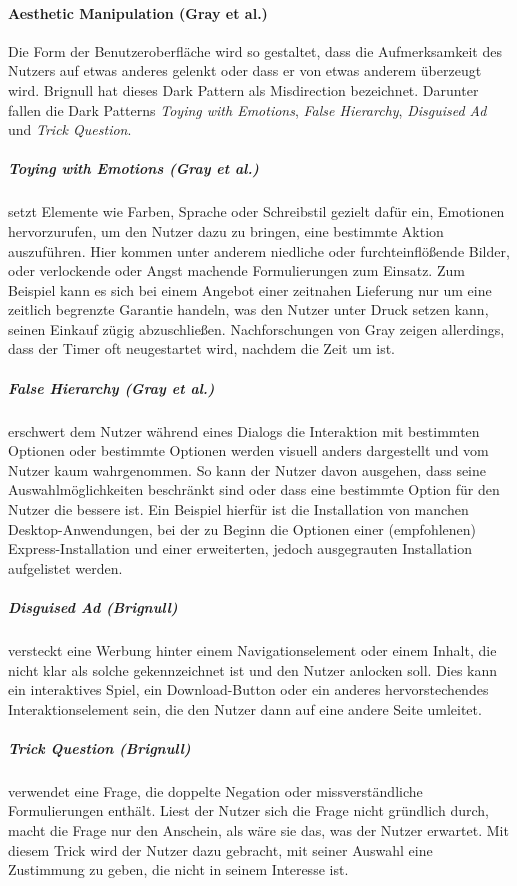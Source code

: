 \documentclass[a4paper]{article}
\newcommand{\todo}[1]{{\color{purple}{#1}}}
\begin{document}
\paragraph{Aesthetic Manipulation (Gray et al.)}
Die Form der Benutzeroberfläche wird so gestaltet, dass die Aufmerksamkeit des Nutzers auf etwas anderes gelenkt oder dass er von etwas anderem überzeugt wird. Brignull hat dieses Dark Pattern als \glqq Misdirection\grqq{} bezeichnet. 
Darunter fallen die Dark Patterns \textit{Toying with Emotions}, \textit{False Hierarchy}, \textit{Disguised Ad} und \textit{Trick Question}.\newline

\subparagraph{Toying with Emotions (Gray et al.)} 
setzt Elemente wie Farben, Sprache oder Schreibstil gezielt dafür ein, Emotionen hervorzurufen, um den Nutzer dazu zu bringen, eine bestimmte Aktion auszuführen. Hier kommen unter anderem niedliche \todo{zu viel oder XD} oder furchteinflößende Bilder, oder verlockende oder Angst machende Formulierungen zum Einsatz. Zum Beispiel kann es sich bei einem Angebot einer zeitnahen Lieferung nur um eine zeitlich begrenzte Garantie handeln, was den Nutzer unter Druck setzen kann, seinen Einkauf zügig abzuschließen. Nachforschungen von Gray zeigen allerdings, dass der Timer oft neugestartet wird, nachdem die Zeit um ist. 

\subparagraph{False Hierarchy (Gray et al.)}
erschwert dem Nutzer während eines Dialogs die Interaktion mit bestimmten Optionen oder bestimmte Optionen werden visuell anders dargestellt und vom Nutzer kaum wahrgenommen. So kann der Nutzer davon ausgehen, dass seine Auswahlmöglichkeiten beschränkt sind oder dass eine bestimmte Option für den Nutzer die bessere ist. Ein Beispiel hierfür ist die Installation von manchen Desktop-Anwendungen, bei der zu Beginn die Optionen einer (empfohlenen) Express-Installation und einer erweiterten, jedoch ausgegrauten Installation aufgelistet werden.

\subparagraph{Disguised Ad (Brignull)}
versteckt eine Werbung hinter einem Navigationselement oder einem Inhalt, die nicht klar als solche gekennzeichnet ist und den Nutzer anlocken soll.
Dies kann ein interaktives Spiel, ein Download-Button oder ein anderes hervorstechendes Interaktionselement sein, die den Nutzer dann auf eine andere Seite umleitet.

\subparagraph{Trick Question (Brignull)}
verwendet eine Frage, die doppelte Negation oder missverständliche Formulierungen enthält. Liest der Nutzer sich die Frage nicht gründlich durch, macht die Frage nur den Anschein, als wäre sie das, was der Nutzer erwartet. Mit diesem Trick wird der Nutzer dazu gebracht, mit seiner Auswahl eine Zustimmung zu geben, die nicht in seinem Interesse ist. 
\end{document}

